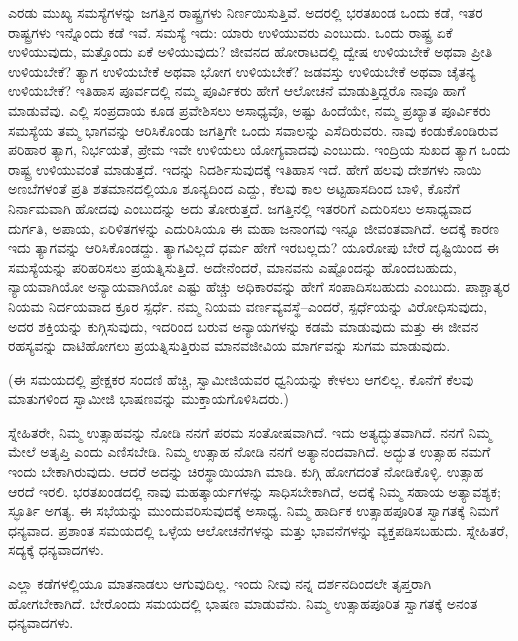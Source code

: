 \vskip 0.2cm

ಎರಡು ಮುಖ್ಯ ಸಮಸ್ಯೆಗಳನ್ನು ಜಗತ್ತಿನ ರಾಷ್ಟ್ರಗಳು ನಿರ್ಣಯಿಸುತ್ತಿವೆ. ಅದರಲ್ಲಿ ಭರತಖಂಡ ಒಂದು ಕಡೆ, ಇತರ ರಾಷ್ಟ್ರಗಳು ಇನ್ನೊಂದು ಕಡೆ ಇವೆ. ಸಮಸ್ಯೆ ಇದು: ಯಾರು ಉಳಿಯುವರು ಎಂಬುದು. ಒಂದು ರಾಷ್ಟ್ರ ಏಕೆ ಉಳಿಯುವುದು, ಮತ್ತೊಂದು ಏಕೆ ಅಳಿಯುವುದು? ಜೀವನದ ಹೋರಾಟದಲ್ಲಿ ದ್ವೇಷ ಉಳಿಯಬೇಕೆ ಅಥವಾ ಪ್ರೀತಿ ಉಳಿಯಬೇಕೆ? ತ್ಯಾಗ ಉಳಿಯಬೇಕೆ ಅಥವಾ ಭೋಗ ಉಳಿಯಬೇಕೆ? ಜಡವಸ್ತು ಉಳಿಯಬೇಕೆ ಅಥವಾ ಚೈತನ್ಯ ಉಳಿಯಬೇಕೆ? ಇತಿಹಾಸ ಪೂರ್ವದಲ್ಲಿ ನಮ್ಮ ಪೂರ್ವಿಕರು ಹೇಗೆ ಆಲೋಚನೆ ಮಾಡುತ್ತಿದ್ದರೊ ನಾವೂ ಹಾಗೆ ಮಾಡುವೆವು. ಎಲ್ಲಿ ಸಂಪ್ರದಾಯ ಕೂಡ ಪ್ರವೇಶಿಸಲು ಅಸಾಧ್ಯವೊ, ಅಷ್ಟು ಹಿಂದೆಯೇ, ನಮ್ಮ ಪ್ರಖ್ಯಾತ ಪೂರ್ವಿಕರು ಸಮಸ್ಯೆಯ ತಮ್ಮ ಭಾಗವನ್ನು ಆರಿಸಿಕೊಂಡು ಜಗತ್ತಿಗೇ ಒಂದು ಸವಾಲನ್ನು ಎಸೆದಿರುವರು. ನಾವು ಕಂಡುಕೊಂಡಿರುವ ಪರಿಹಾರ ತ್ಯಾಗ, ನಿರ್ಭಯತೆ, ಪ್ರೇಮ ಇವೇ ಉಳಿಯಲು ಯೋಗ್ಯವಾದವು ಎಂಬುದು. ಇಂದ್ರಿಯ ಸುಖದ ತ್ಯಾಗ ಒಂದು ರಾಷ್ಟ್ರ ಉಳಿಯುವಂತೆ ಮಾಡುತ್ತದೆ. ಇದನ್ನು ನಿದರ್ಶಿಸುವುದಕ್ಕೆ ಇತಿಹಾಸ ಇದೆ. ಹೇಗೆ ಹಲವು ದೇಶಗಳು ನಾಯಿ ಅಣಬೆಗಳಂತೆ ಪ್ರತಿ ಶತಮಾನದಲ್ಲಿಯೂ ಶೂನ್ಯದಿಂದ ಎದ್ದು, ಕೆಲವು ಕಾಲ ಅಟ್ಟಹಾಸದಿಂದ ಬಾಳಿ, ಕೊನೆಗೆ ನಿರ್ನಾಮವಾಗಿ ಹೋದವು ಎಂಬುದನ್ನು ಅದು ತೋರುತ್ತದೆ. ಜಗತ್ತಿನಲ್ಲಿ ಇತರರಿಗೆ ಎದುರಿಸಲು ಅಸಾಧ್ಯವಾದ ದುರ್ಗತಿ, ಅಪಾಯ, ಏರಿಳಿತಗಳನ್ನು ಎದುರಿಸಿಯೂ ಈ ಮಹಾ ಜನಾಂಗವು ಇನ್ನೂ ಜೀವಂತವಾಗಿದೆ. ಅದಕ್ಕೆ ಕಾರಣ ಇದು ತ್ಯಾಗವನ್ನು ಆರಿಸಿಕೊಂಡದ್ದು. ತ್ಯಾಗವಿಲ್ಲದೆ ಧರ್ಮ ಹೇಗೆ ಇರಬಲ್ಲದು? ಯೂರೋಪು ಬೇರೆ ದೃಷ್ಟಿಯಿಂದ ಈ ಸಮಸ್ಯೆಯನ್ನು ಪರಿಹರಿಸಲು ಪ್ರಯತ್ನಿಸುತ್ತಿದೆ. ಅದೇನೆಂದರೆ, ಮಾನವನು ಎಷ್ಟೊಂದನ್ನು ಹೊಂದಬಹುದು, ನ್ಯಾಯವಾಗಿಯೋ ಅನ್ಯಾಯವಾಗಿಯೋ ಎಷ್ಟು ಹೆಚ್ಚು ಅಧಿಕಾರವನ್ನು ಹೇಗೆ ಸಂಪಾದಿಸಬಹುದು ಎಂಬುದು. ಪಾಶ್ಚಾತ್ಯರ ನಿಯಮ ನಿರ್ದಯವಾದ ಕ್ರೂರ ಸ್ಪರ್ಧೆ. ನಮ್ಮ ನಿಯಮ ವರ್ಣವ್ಯವಸ್ಥೆ–ಎಂದರೆ, ಸ್ಪರ್ಧೆಯನ್ನು ವಿರೋಧಿಸುವುದು, ಅದರ ಶಕ್ತಿಯನ್ನು ಕುಗ್ಗಿಸುವುದು, ಇದರಿಂದ ಬರುವ ಅನ್ಯಾಯಗಳನ್ನು ಕಡಮೆ ಮಾಡುವುದು ಮತ್ತು ಈ ಜೀವನ ರಹಸ್ಯವನ್ನು ದಾಟಿಹೋಗಲು ಪ್ರಯತ್ನಿಸುತ್ತಿರುವ ಮಾನವಜೀವಿಯ ಮಾರ್ಗವನ್ನು ಸುಗಮ ಮಾಡುವುದು.

\vskip 0.2cm

(ಈ ಸಮಯದಲ್ಲಿ ಪ್ರೇಕ್ಷಕರ ಸಂದಣಿ ಹೆಚ್ಚಿ, ಸ್ವಾಮೀಜಿಯವರ ಧ್ವನಿಯನ್ನು ಕೇಳಲು ಆಗಲಿಲ್ಲ. ಕೊನೆಗೆ ಕೆಲವು ಮಾತುಗಳಿಂದ ಸ್ವಾಮೀಜಿ ಭಾಷಣವನ್ನು ಮುಕ್ತಾಯಗೊಳಿಸಿದರು.)


ಸ್ನೇಹಿತರೇ, ನಿಮ್ಮ ಉತ್ಸಾಹವನ್ನು ನೋಡಿ ನನಗೆ ಪರಮ ಸಂತೋಷವಾಗಿದೆ. ಇದು ಅತ್ಯದ್ಭುತವಾಗಿದೆ. ನನಗೆ ನಿಮ್ಮ ಮೇಲೆ ಅತೃಪ್ತಿ ಎಂದು ಎಣಿಸಬೇಡಿ. ನಿಮ್ಮ ಉತ್ಸಾಹ ನೋಡಿ ನನಗೆ ಅತ್ಯಾನಂದವಾಗಿದೆ. ಅದ್ಭುತ ಉತ್ಸಾಹ ನಮಗೆ ಇಂದು ಬೇಕಾಗಿರುವುದು. ಆದರೆ ಅದನ್ನು ಚಿರಸ್ಥಾಯಿಯಾಗಿ ಮಾಡಿ. ಕುಗ್ಗಿ ಹೋಗದಂತೆ ನೋಡಿಕೊಳ್ಳಿ. ಉತ್ಸಾಹ ಆರದೆ ಇರಲಿ. ಭರತಖಂಡದಲ್ಲಿ ನಾವು ಮಹತ್ಕಾರ್ಯಗಳನ್ನು ಸಾಧಿಸಬೇಕಾಗಿದೆ, ಅದಕ್ಕೆ ನಿಮ್ಮ ಸಹಾಯ ಅತ್ಯಾವಶ್ಯಕ; ಸ್ಫೂರ್ತಿ ಅಗತ್ಯ. ಈ ಸಭೆಯನ್ನು ಮುಂದುವರಿಸುವುದಕ್ಕೆ ಅಸಾಧ್ಯ. ನಿಮ್ಮ ಹಾರ್ದಿಕ ಉತ್ಸಾಹಪೂರಿತ ಸ್ವಾಗತಕ್ಕೆ ನಿಮಗೆ ಧನ್ಯವಾದ. ಪ್ರಶಾಂತ ಸಮಯದಲ್ಲಿ ಒಳ್ಳೆಯ ಆಲೋಚನೆಗಳನ್ನು ಮತ್ತು ಭಾವನೆಗಳನ್ನು ವ್ಯಕ್ತಪಡಿಸಬಹುದು. ಸ್ನೇಹಿತರೆ, ಸದ್ಯಕ್ಕೆ ಧನ್ಯವಾದಗಳು.

\vskip 0.2cm

ಎಲ್ಲಾ ಕಡೆಗಳಲ್ಲಿಯೂ ಮಾತನಾಡಲು ಆಗುವುದಿಲ್ಲ. ಇಂದು ನೀವು ನನ್ನ ದರ್ಶನದಿಂದಲೇ ತೃಪ್ತರಾಗಿ ಹೋಗಬೇಕಾಗಿದೆ. ಬೇರೊಂದು ಸಮಯದಲ್ಲಿ ಭಾಷಣ ಮಾಡುವೆನು. ನಿಮ್ಮ ಉತ್ಸಾಹಪೂರಿತ ಸ್ವಾಗತಕ್ಕೆ ಅನಂತ ಧನ್ಯವಾದಗಳು.

